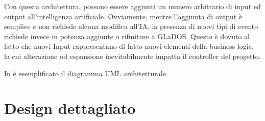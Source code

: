 \documentclass[a4paper,12pt]{report}
\begin{document}
Con questa architettura, possono essere aggiunti un numero arbitrario di input ed output
all'intelligenza artificiale.
%
Ovviamente, mentre l'aggiunta di output è semplice e non richiede alcuna modifica all'IA, la
presenza di nuovi tipi di evento richiede invece in potenza aggiunte o rifiniture a GLaDOS.
%
Questo è dovuto al fatto che nuovi Input rappresentano di fatto nuovi elementi della business
logic, la cui alterazione od espansione inevitabilmente impatta il controller del progetto.

In  è esemplificato il diagramma UML architetturale.


\section{Design dettagliato}
\end{document}
